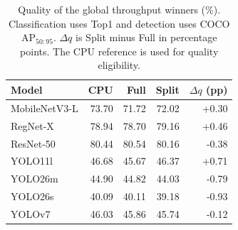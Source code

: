 \begin{table}[!htb]
\centering\small\setlength{\tabcolsep}{3pt}
\caption{Quality of the global throughput winners (\%). Classification uses Top1 and detection uses COCO AP$_{50:95}$. $\Delta q$ is Split minus Full in percentage points. The CPU reference is used for quality eligibility.}
\label{tab:review:quality}

\begin{tabular}{@{}lrrrr@{}}
\toprule
Model & CPU & Full & Split & $\Delta q$ (pp) \\
\midrule
MobileNetV3-L & 73.70 & 71.72 & 72.02 & +0.30 \\
RegNet-X & 78.94 & 78.70 & 79.16 & +0.46 \\
ResNet-50 & 80.44 & 80.54 & 80.16 & -0.38 \\
YOLO11l & 46.68 & 45.67 & 46.37 & +0.71 \\
YOLO26m & 44.90 & 44.82 & 44.03 & -0.79 \\
YOLO26s & 40.09 & 40.11 & 39.18 & -0.93 \\
YOLOv7 & 46.03 & 45.86 & 45.74 & -0.12 \\
\bottomrule
\end{tabular}
\end{table}
